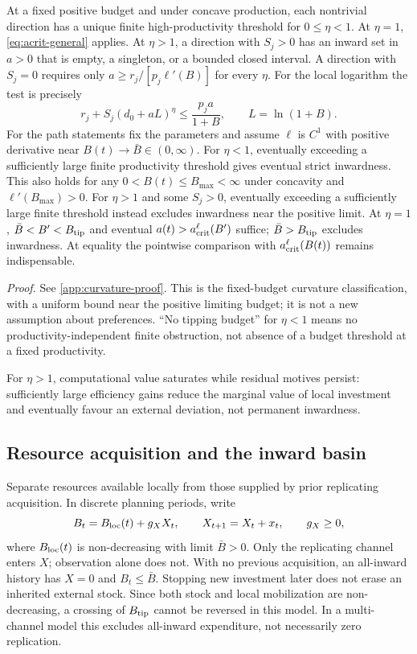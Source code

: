 \begin{corollary}
\label{prop:curvature}
At a fixed positive budget and under concave production, each nontrivial
direction has a unique finite high-productivity threshold for
$0\leq\eta<1$. At $\eta=1$, \cref{eq:acrit-general} applies.
At $\eta>1$, a direction with $S_j>0$ has an inward set in $a>0$
that is empty, a singleton, or a bounded closed interval. A direction
with $S_j=0$ requires only $a\geq r_j/[p_j\ell'(B)]$ for every $\eta$.
For the local logarithm the test is precisely
\begin{equation}
 r_j+S_j(d_0+aL)^\eta\leq\frac{p_ja}{1+B},
 \qquad L=\ln(1+B).
 \label{eq:iso-corner}
\end{equation}
For the path statements fix the parameters and assume $\ell$ is $C^1$
with positive derivative near $B(t)\to\bar B\in(0,\infty)$.
For $\eta<1$, eventually exceeding a sufficiently large finite productivity
threshold gives eventual strict inwardness. This also holds for any
$0<B(t)\leq B_{\max}<\infty$ under concavity and
$\ell'(B_{\max})>0$. For $\eta>1$ and some $S_j>0$, eventually
exceeding a sufficiently large finite threshold instead excludes inwardness
near the positive limit. At $\eta=1$, $\bar B<B'<B_{\rm tip}$ and
eventual $a(t)>a_{\rm crit}^{\ell}(B')$ suffice; $\bar B>B_{\rm tip}$
excludes inwardness. At equality the pointwise comparison with
$a_{\rm crit}^{\ell}(B(t))$ remains indispensable.
\end{corollary}
\noindent\emph{Proof.}
See \cref{app:curvature-proof}. This is the fixed-budget curvature
classification, with a uniform bound near the positive limiting budget;
it is not a new assumption about preferences. ``No tipping budget''
for $\eta<1$ means no productivity-independent finite obstruction,
not absence of a budget threshold at a fixed productivity.

For $\eta>1$, computational value saturates while residual motives persist:
sufficiently large efficiency gains reduce the marginal value of local
investment and eventually favour an external deviation, not permanent inwardness.

\subsection{Resource acquisition and the inward basin}

Separate resources available locally from those supplied by prior
replicating acquisition. In discrete planning periods, write
\begin{equation}
 B_t=B_{\rm loc}(t)+g_XX_t,\qquad
 X_{t+1}=X_t+x_t,\qquad g_X\geq0,
 \label{eq:acquisition-stock}
\end{equation}
where $B_{\rm loc}(t)$ is non-decreasing with limit $\bar B>0$.
Only the replicating channel enters $X$; observation alone does not.
With no previous acquisition, an all-inward history has $X=0$ and
$B_t\leq\bar B$. Stopping new investment later does not erase an
inherited external stock. Since both stock and local mobilization are
non-decreasing, a crossing of $B_{\rm tip}$ cannot be reversed in this
model. In a multi-channel model this excludes all-inward expenditure,
not necessarily zero replication.

